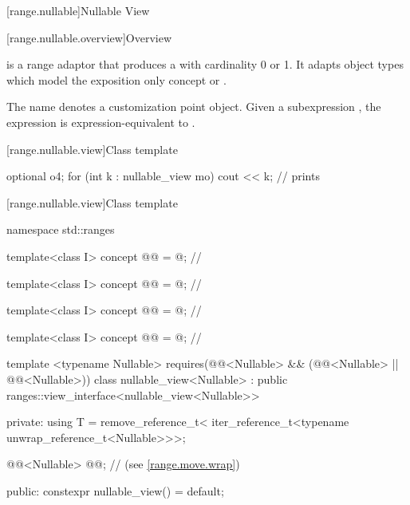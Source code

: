 \documentclass[a4paper,10pt,oneside,openany,final,article]{memoir}
\begin{document}
\begin{wording}
[range.nullable]{Nullable View}

[range.nullable.overview]{Overview}

\pnum
{} is a range adaptor that produces a  with cardinality 0 or 1. It adapts object types which model the exposition only concept  or .


\pnum
{}%
The name  denotes a
customization point object.
Given a subexpression , the expression
 is expression-equivalent to
.

[range.nullable.view]{Class template }

\begin{example}
  \begin{codeblock}
    optional o{4};
    for (int k : nullable_view m{o})
      cout << k;        // prints 
  \end{codeblock}
\end{example}

[range.nullable.view]{Class template }

\begin{codeblock}
namespace std::ranges {
  template<class I>
  concept @@ = @\seebelownc@;  // \expos

  template<class I>
    concept @@ = @\seebelownc@;  // \expos

  template<class I>
    concept @@ = @\seebelownc@;  // \expos

  template<class I>
    concept @@ = @\seebelownc@;    // \expos

  template <typename Nullable>
    requires(@@<Nullable> &&
      (@@<Nullable> || @@<Nullable>))
  class nullable_view<Nullable>
    : public ranges::view_interface<nullable_view<Nullable>> {
  private:
    using T = remove_reference_t<
        iter_reference_t<typename unwrap_reference_t<Nullable>>>;

    @@<Nullable> @@; // \expos{} (see \ref{range.move.wrap})

  public:
    constexpr nullable_view() = default;

}}
\end{codeblock}
\end{wording}
\end{document}
